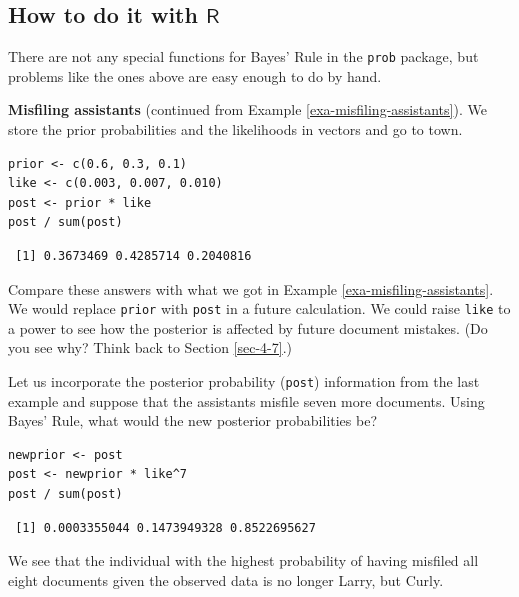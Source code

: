 \documentclass[captions=tableheading]{scrbook}
\begin{document}
\subsection{How to do it with \(\mathsf{R}\)}
\label{sec-4-8-1}


There are not any special functions for Bayes' Rule in the \texttt{prob} package, but problems like the ones above are easy enough to do by hand.

\begin{example}
\textbf{Misfiling assistants} (continued from Example \ref{exa-misfiling-assistants}). We store the prior probabilities and the likelihoods in vectors and go to town.


\lstset{language=R}
\begin{lstlisting}
prior <- c(0.6, 0.3, 0.1)
like <- c(0.003, 0.007, 0.010)
post <- prior * like
post / sum(post)
\end{lstlisting}

\begin{verbatim}
 [1] 0.3673469 0.4285714 0.2040816
\end{verbatim}

\end{example}


Compare these answers with what we got in Example \ref{exa-misfiling-assistants}. We would replace \texttt{prior} with \texttt{post} in a future calculation. We could raise \texttt{like} to a power to see how the posterior is affected by future document mistakes. (Do you see why? Think back to Section \ref{sec-4-7}.)


\begin{example}
Let us incorporate the posterior probability (\texttt{post}) information from the last example and suppose that the assistants misfile seven more documents. Using Bayes' Rule, what would the new posterior probabilities be?


\lstset{language=R}
\begin{lstlisting}
newprior <- post
post <- newprior * like^7
post / sum(post)
\end{lstlisting}

\begin{verbatim}
 [1] 0.0003355044 0.1473949328 0.8522695627
\end{verbatim}

We see that the individual with the highest probability of having misfiled all eight documents given the observed data is no longer Larry, but Curly. 
\end{example}
\end{document}
